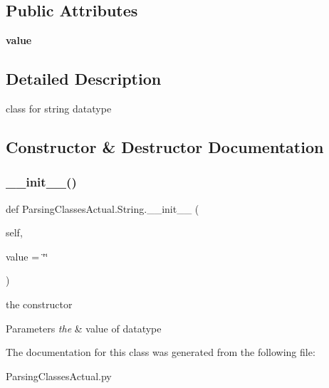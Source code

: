 \subsection*{Public Attributes}
\begin{DoxyCompactItemize}
\item 
\mbox{\label{class_parsing_classes_actual_1_1_string_a184687889206e8d800af3384c4c61265}} 
{\bfseries value}
\end{DoxyCompactItemize}


\subsection{Detailed Description}
class for string datatype 

\subsection{Constructor \& Destructor Documentation}
\mbox{\label{class_parsing_classes_actual_1_1_string_a8f97f0ea4e268f51804084ae84435c52}} 
\subsubsection{\texorpdfstring{\+\_\+\+\_\+init\+\_\+\+\_\+()}{\_\_init\_\_()}}
{\footnotesize\ttfamily def Parsing\+Classes\+Actual.\+String.\+\_\+\+\_\+init\+\_\+\+\_\+ (\begin{DoxyParamCaption}\item[{}]{self,  }\item[{}]{value = {\ttfamily \textquotesingle{}\char`\"{}\char`\"{}\textquotesingle{}} }\end{DoxyParamCaption})}



the constructor 


\begin{DoxyParams}{Parameters}
{\em the} & value of datatype \\
\hline
\end{DoxyParams}


The documentation for this class was generated from the following file\+:\begin{DoxyCompactItemize}
\item 
Parsing\+Classes\+Actual.\+py\end{DoxyCompactItemize}
